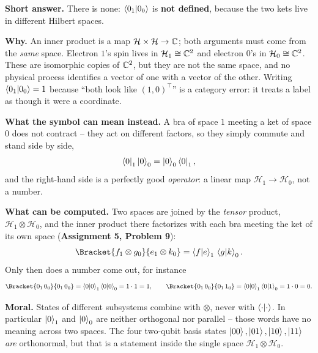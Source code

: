 \documentclass[a4paper, 10pt]{article}
\begin{document}
\begin{solution}
	\noindent \textbf{Short answer.} There is none: \( \braket{0_1 \vert 0_0} \) is \textbf{not defined}, because the two kets live in different Hilbert spaces.

	\noindent \textbf{Why.} An inner product is a map \( \mathcal{H} \times \mathcal{H} \to \mathbb{C} \); both arguments must come from the \emph{same} space.
	Electron \( 1 \)'s spin lives in \( \mathcal{H}_1 \cong \mathbb{C}^2 \) and electron \( 0 \)'s in \( \mathcal{H}_0 \cong \mathbb{C}^2 \).
	These are isomorphic copies of \( \mathbb{C}^2 \), but they are not the same space, and no physical process identifies a vector of one with a vector of the other.
	Writing \( \braket{0_1 \vert 0_0} = 1 \) because ``both look like \( (1,0)^{\top} \)'' is a category error: it treats a label as though it were a coordinate.

	\noindent \textbf{What the symbol can mean instead.} A bra of space \( 1 \) meeting a ket of space \( 0 \) does not contract -- they act on different factors, so they simply commute and stand side by side,
	\[
		\bra{0}_1 \ket{0}_0 = \ket{0}_0 \bra{0}_1,
	\]
	and the right-hand side is a perfectly good \emph{operator}: a linear map \( \mathcal{H}_1 \to \mathcal{H}_0 \), not a number.

	\noindent \textbf{What can be computed.} Two spaces are joined by the \emph{tensor} product, \( \mathcal{H}_1 \otimes \mathcal{H}_0 \), and the inner product there factorizes with each bra meeting the ket of its own space (\textbf{Assignment 5, Problem 9}):
	\[
		\Bracket{f_1 \otimes g_0}{e_1 \otimes k_0} = \braket{f \vert e}_1 \, \braket{g \vert k}_0 .
	\]
	Only then does a number come out, for instance
	\[
		\Bracket{0_1 \, 0_0}{0_1 \, 0_0} = \braket{0 \vert 0}_1 \braket{0 \vert 0}_0 = 1 \cdot 1 = 1,
		\qquad
		\Bracket{0_1 \, 0_0}{0_1 \, 1_0} = \braket{0 \vert 0}_1 \braket{0 \vert 1}_0 = 1 \cdot 0 = 0 .
	\]

	\noindent \textbf{Moral.} States of different subsystems combine with \( \otimes \), never with \( \braket{\cdot \vert \cdot} \).
	In particular \( \ket{0}_1 \) and \( \ket{0}_0 \) are neither orthogonal nor parallel -- those words have no meaning across two spaces.
	The four two-qubit basis states \( \ket{00}, \ket{01}, \ket{10}, \ket{11} \) \emph{are} orthonormal, but that is a statement inside the single space \( \mathcal{H}_1 \otimes \mathcal{H}_0 \).
\end{solution}
\end{document}
